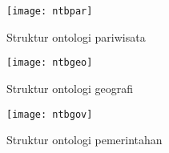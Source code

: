 \begin{landscape}
\begin{figure}[h]
	\texttt{[image: ntbpar]}
	\caption{Struktur ontologi pariwisata}
	\label{fig:struktur_ntbpar}
\end{figure}
\end{landscape}

\begin{figure}[h]
	\texttt{[image: ntbgeo]}
	\caption{Struktur ontologi geografi}
	\label{fig:struktur_ntbgeo}
\end{figure}

\begin{landscape}
	\begin{figure}[h]
		\texttt{[image: ntbgov]}
		\caption{Struktur ontologi pemerintahan}
		\label{fig:struktur_ntbgov}
	\end{figure}
\end{landscape}